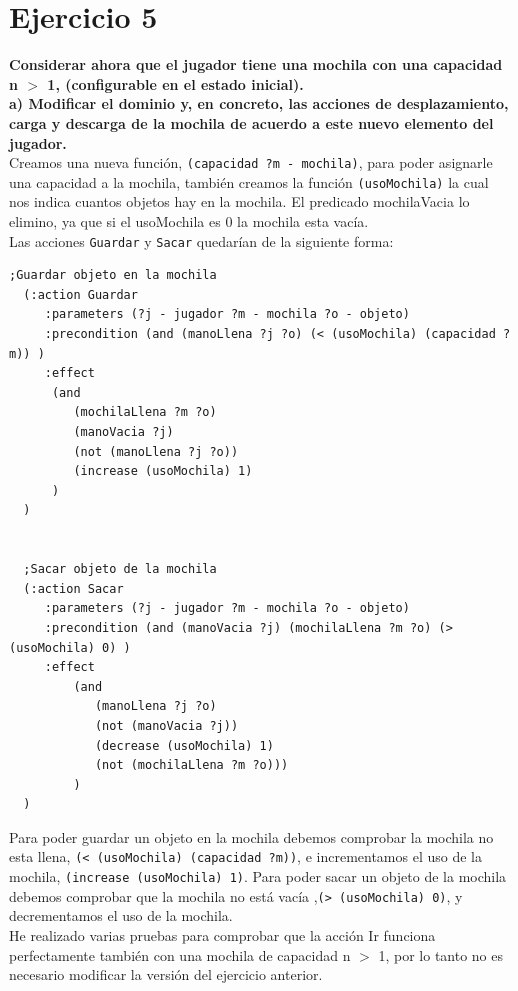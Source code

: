 \documentclass[12pt]{article}
\begin{document}
\section{Ejercicio 5}\textbf{Considerar ahora que el jugador tiene una mochila con una capacidad n $>$ 1, (configurable en el estado inicial).}\\

\textbf{a) Modificar el dominio y, en concreto, las acciones de desplazamiento, carga y
descarga de la mochila de acuerdo a este nuevo elemento del jugador.}\\

Creamos una nueva función, \texttt{(capacidad ?m - mochila)}, para poder asignarle una capacidad a la mochila, también creamos la función \texttt{(usoMochila)} la cual nos indica cuantos objetos hay en la mochila. El predicado mochilaVacia lo elimino, ya que si el usoMochila es 0 la mochila esta vacía.\\

Las acciones \texttt{Guardar} y \texttt{Sacar} quedarían de la siguiente forma:

\begin{verbatim}
;Guardar objeto en la mochila
  (:action Guardar
     :parameters (?j - jugador ?m - mochila ?o - objeto)
     :precondition (and (manoLlena ?j ?o) (< (usoMochila) (capacidad ?m)) )
     :effect
      (and
         (mochilaLlena ?m ?o)
         (manoVacia ?j)
         (not (manoLlena ?j ?o))
         (increase (usoMochila) 1)
      )
  )


  ;Sacar objeto de la mochila
  (:action Sacar
     :parameters (?j - jugador ?m - mochila ?o - objeto)
     :precondition (and (manoVacia ?j) (mochilaLlena ?m ?o) (> (usoMochila) 0) )
     :effect
         (and
            (manoLlena ?j ?o)
            (not (manoVacia ?j))
            (decrease (usoMochila) 1)
            (not (mochilaLlena ?m ?o)))
         )
  )
\end{verbatim}

Para poder guardar un objeto en la mochila debemos comprobar la mochila no esta llena, \texttt{(< (usoMochila) (capacidad ?m))}, e incrementamos el uso de la mochila, \texttt{(increase (usoMochila) 1)}. Para poder sacar un objeto de la mochila debemos comprobar que la mochila no está vacía ,\texttt{(> (usoMochila) 0)}, y decrementamos el uso de la mochila.\\

He realizado varias pruebas para comprobar que la acción Ir funciona perfectamente también con una mochila de capacidad n $>$ 1, por lo tanto no es necesario modificar la versión del ejercicio anterior.\\
\end{document}
